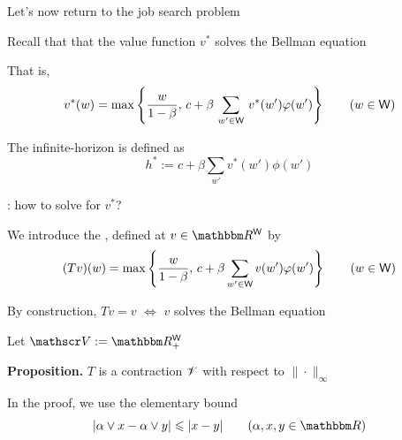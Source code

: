 \begin{frame}

    Let's now return to the job search problem 

    Recall that that the value function $v^*$ solves the Bellman equation

    \vspace{1em}

    That is,
    \begin{equation*}
        v^*(w) = 
        \max \left\{
            \frac{w}{1-\beta}
            ,\,
            c + \beta \, \sum_{w' \in \mathsf W} \, v^*(w') \varphi(w')
            \right\}
            \qquad (w \in \mathsf W)
    \end{equation*}

    \vspace{1em}

    The infinite-horizon  is defined as
    \begin{equation*}
        h^* := c + \beta \sum_{w'} v^*(w') \phi(w') 
    \end{equation*}

    : how to solve for $v^*$?  

\end{frame}


\begin{frame}

    We introduce the , defined at
    $v \in \RR^\Wsf$ by
    \begin{equation*}
        (Tv)(w) 
        = 
        \max 
        \left\{
            \frac{w}{1-\beta}
            ,\,
            c + \beta \sum_{w' \in \mathsf W} v(w') \varphi(w')
        \right\}
        \qquad (w \in \mathsf W)
    \end{equation*}

    By construction, $Tv=v$ $\iff$ $v$ solves the Bellman equation 

        \vspace{0.5em}
    Let $\vV := \RR^\Wsf_+$ 

        \vspace{0.5em}
    {\bf Proposition.} $T$ is a contraction $\mathscr V$
        with respect to $\| \cdot \|_\infty$

        \vspace{0.5em}
    In the proof, we use the elementary bound
    \begin{equation*}
        |\alpha \vee x - \alpha \vee y| \leq |x - y|
        \qquad (\alpha, x, y \in \RR)
    \end{equation*}

\end{frame}


